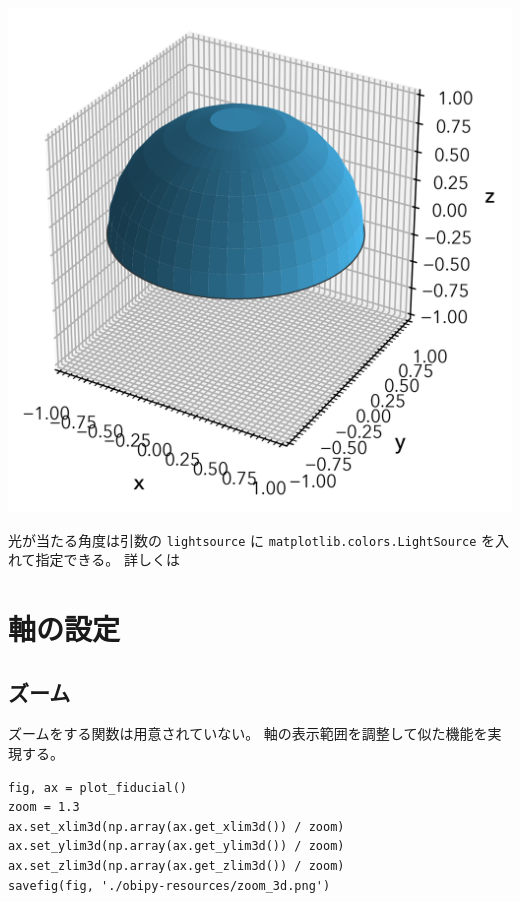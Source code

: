 \documentclass[a4paper, 10pt, notitlepage, twocolumn, uplatex, oneside, dvipdfmx]{jsarticle}
\begin{document}
\label{}
\begin{center}
\includegraphics[width=1.0\linewidth]{./obipy-resources/surface_3d.png}
\end{center}

光が当たる角度は引数の \texttt{lightsource} に \texttt{matplotlib.colors.LightSource} を入れて指定できる。
詳しくは
\section{軸の設定}
\label{sec:org64c14f3}
\subsection{ズーム}
\label{sec:org99ba930}
ズームをする関数は用意されていない。
軸の表示範囲を調整して似た機能を実現する。
\begin{verbatim}
fig, ax = plot_fiducial()
zoom = 1.3
ax.set_xlim3d(np.array(ax.get_xlim3d()) / zoom)
ax.set_ylim3d(np.array(ax.get_ylim3d()) / zoom)
ax.set_zlim3d(np.array(ax.get_zlim3d()) / zoom)
savefig(fig, './obipy-resources/zoom_3d.png')
\end{verbatim}
\end{document}
